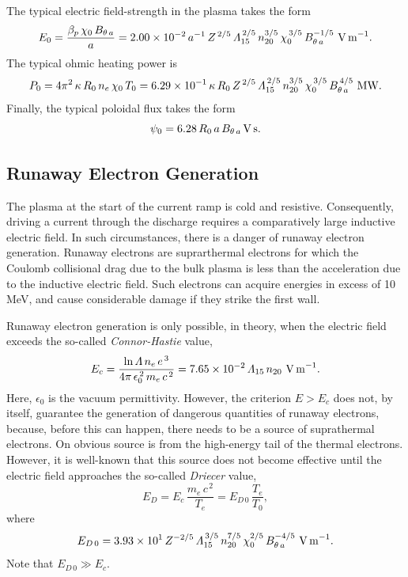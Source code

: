 \documentclass[12pt,prb,aps]{revtex4-1}
\begin{document}
 The typical electric field-strength in the plasma takes the form
 \begin{equation}
 E_0 =\frac{\beta_p\,\chi_0\,B_{\theta\,a}}{a} = 2.00\times 10^{-2}\,a^{-1}\,Z^{\,2/5}\,{\mit\Lambda}_{15}^{\,2/5}\,n_{20}^{3/5}\,\chi_0^{\,3/5}\,B_{\theta\,a}^{-1/5}\,\,{\rm V\,m}^{-1}.
 \end{equation}
 The typical ohmic heating power is
 \begin{equation}
 P_0 = 4\pi^2\,\kappa\,R_0\,n_e\,\chi_0\,T_0 = 6.29\times 10^{-1}\,\kappa\,R_0\,Z^{\,2/5}\,{\mit\Lambda}_{15}^{\,2/5}\,n_{20}^{3/5}\,\chi_0^{\,3/5}\,B_{\theta\,a}^{\,4/5}\,\,{\rm MW}.
 \end{equation}
 Finally, the typical poloidal flux takes the form 
 \begin{equation}
 \psi_0= 6.28\,R_0\,a\,B_{\theta\,a}\,{\rm V\,s}.
 \end{equation}
 
\subsection{Runaway Electron Generation}
 The plasma at the start of the current ramp is cold and resistive. Consequently, driving a current through the discharge requires a comparatively large inductive electric field. In such 
 circumstances, there is a danger of runaway electron generation. Runaway electrons are suprarthermal electrons for which the Coulomb collisional drag due to the bulk plasma is
 less than the acceleration due to the inductive electric field. Such electrons can acquire energies in excess of 10 MeV, and  cause considerable damage if they strike the 
 first wall. 
 
 Runaway electron generation is only possible, in theory,  when the electric field exceeds the so-called {\em Connor-Hastie}\/ value,\cite{connor}
 \begin{equation}
 E_c = \frac{\ln{\mit\Lambda}\,n_e\,e^{\,3}}{4\pi\,\epsilon_0^{\,2}\,m_e\,c^{\,2}} = 7.65\times 10^{-2}\,{\mit\Lambda}_{15}\,n_{20}\,\,{\rm V\,m}^{-1}.
 \end{equation}
 Here, $\epsilon_0$ is the vacuum permittivity. 
 However, the criterion $E>E_c$ does not,  by itself, guarantee the generation of dangerous quantities of runaway electrons, because, before this
 can happen, there needs to be a source of suprathermal electrons. On obvious source is from the high-energy tail of the thermal electrons. However,
 it is well-known that this source does not become effective until the electric field approaches the so-called {\em Driecer}\/ value,\cite{dreicer}
 \begin{equation}
 E_D = E_c\,\frac{m_e\,c^{\,2}}{T_e}= E_{D\,0}\,\frac{T_e}{T_0},
 \end{equation}
 where
 \begin{equation}
 E_{D\,0} = 3.93\times 10^{1}\,Z^{-2/5}\,{\mit\Lambda}_{15}^{\,3/5}\,n_{20}^{7/5}\,\chi_0^{2/5}\,B_{\theta\,a}^{-4/5}\,\,{\rm V\,m}^{-1}.
 \end{equation}
 Note that $E_{D\,0}\gg E_c$. 
 
\end{document}
